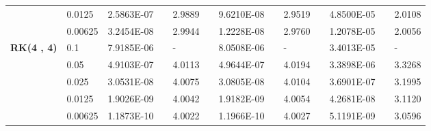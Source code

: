 \begin{table}[H]
\begin{tabular}{lllllrlrlrlrlrl}
	\multicolumn{2}{l}{} & \multicolumn{2}{l}{0.0125} & 2.5863E-07 &       & 2.9889  &       & 9.6210E-08 &       & 2.9519  &       & 4.8500E-05 &       & 2.0108  \\
	\multicolumn{2}{l}{} & \multicolumn{2}{l}{0.00625} & 3.2454E-08 &       & 2.9944  &       & 1.2228E-08 &       & 2.9760  &       & 1.2078E-05 &       & 2.0056  \\
	\multicolumn{2}{l}{\multirow{5}[1]{*}{\textbf{RK(4 , 4)}}} & \multicolumn{2}{l}{0.1} & 7.9185E-06 &       &-    &       & 8.0508E-06 &       &-    &       & 3.4013E-05 &       &-\\
	\multicolumn{2}{l}{} & \multicolumn{2}{l}{0.05} & 4.9103E-07 &       & 4.0113  &       & 4.9644E-07 &       & 4.0194  &       & 3.3898E-06 &       & 3.3268  \\
	\multicolumn{2}{l}{} & \multicolumn{2}{l}{0.025} & 3.0531E-08 &       & 4.0075  &       & 3.0805E-08 &       & 4.0104  &       & 3.6901E-07 &       & 3.1995  \\
	\multicolumn{2}{l}{} & \multicolumn{2}{l}{0.0125} & 1.9026E-09 &       & 4.0042  &       & 1.9182E-09 &       & 4.0054  &       & 4.2681E-08 &       & 3.1120  \\
	\multicolumn{2}{l}{} & \multicolumn{2}{l}{0.00625} & 1.1873E-10 &       & 4.0022  &       & 1.1966E-10 &       & 4.0027  &       & 5.1191E-09 &       & 3.0596  \\
	\bottomrule
	\end{tabular}%
	\label{tab_SAVRRK:6-2}%
	\end{table}%

\vspace{-8mm}


